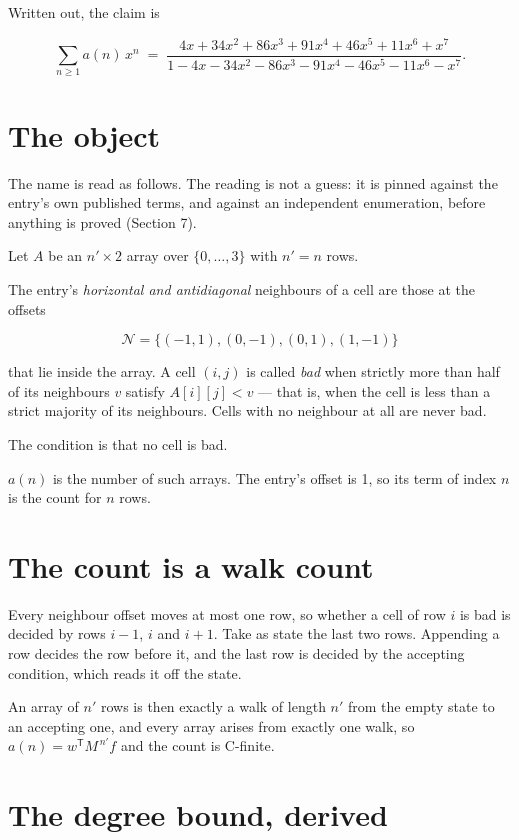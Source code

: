 \documentclass[11pt]{article}
\theoremstyle{definition}
\begin{document}
Written out, the claim is

\[\sum_{n \ge 1} a(n)\,x^n \;=\; \frac{4x + 34x^{2} + 86x^{3} + 91x^{4} + 46x^{5} + 11x^{6} + x^{7}}{1 - 4x - 34x^{2} - 86x^{3} - 91x^{4} - 46x^{5} - 11x^{6} - x^{7}}.\]

\section{The object}

The name is read as follows. The reading is not a guess: it is pinned against the entry's own published terms, and against an independent enumeration, before anything is proved (Section 7).

Let $A$ be an $n' \times 2$ array over $\{0,\dots,3\}$ with $n' = n$ rows.

The entry's {\itshape horizontal and antidiagonal} neighbours of a cell are those at the offsets

\[\mathcal{N} = \{(-1,1), (0,-1), (0,1), (1,-1)\}\]

that lie inside the array. A cell $(i,j)$ is called {\itshape bad} when strictly more than half of its neighbours $v$ satisfy $A[i][j] < v$ --- that is, when the cell is less than a strict majority of its neighbours. Cells with no neighbour at all are never bad.

The condition is that no cell is bad.

$a(n)$ is the number of such arrays. The entry's offset is 1, so its term of index $n$ is the count for $n$ rows.

\section{The count is a walk count}

Every neighbour offset moves at most one row, so whether a cell of row $i$ is bad is decided by rows $i-1$, $i$ and $i+1$. Take as state the last two rows. Appending a row decides the row before it, and the last row is decided by the accepting condition, which reads it off the state.

An array of $n'$ rows is then exactly a walk of length $n'$ from the empty state to an accepting one, and every array arises from exactly one walk, so $a(n) = w^{\mathsf T}M^{\,n'}f$ and the count is C-finite.

\section{The degree bound, derived}
\end{document}

